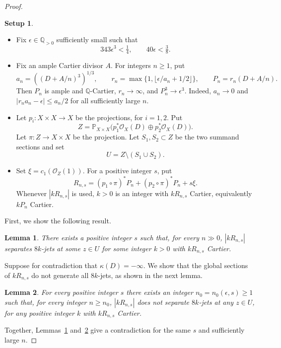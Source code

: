 \documentclass[12pt,a4paper,psamsfonts]{amsart}
\theoremstyle{definition}
\newtheorem*{setup}{Setup}
\theoremstyle{plain}
\newtheorem{lemma}{Lemma}[section]
\newcommand{\Q}{\mathbb Q}
\newcommand{\OO}{\mathcal O}
\begin{document}
\begin{proof}
\begin{setup}
\leavevmode
\begin{itemize}
\setlength{\itemsep}{2pt}
\setlength{\parsep}{0pt}
\item Fix $\epsilon\in\Q_{>0}$ sufficiently small such that
\[
 343\epsilon^3<\tfrac14,\qquad40\epsilon<\tfrac38.
\]
\item Fix an ample Cartier divisor $A$.
For integers $n\ge1$, put
\[
 a_n=((D+A/n)^3)^{1/3},\qquad
 r_n=\max\{1,\lfloor\epsilon/a_n+1/2\rfloor\},\qquad
 P_n=r_n(D+A/n).
\]
Then $P_n$ is ample and $\mathbb{Q}$-Cartier, $r_n\to\infty$, and
$P_n^3\to\epsilon^3$. Indeed, $a_n\to0$ and
$|r_na_n-\epsilon|\le a_n/2$ for all sufficiently large $n$.
\item Let $p_i:X\times X\to X$ be the projections, for $i=1,2$.
Put
\[
 Z=\mathbb P_{X\times X}
       \bigl(p_1^*\OO_X(D)\oplus p_2^*\OO_X(D)\bigr).
\]
Let $\pi:Z\to X\times X$ be the projection.
Let $S_1,S_2\subset Z$ be the two summand sections and set
\[
 U=Z\setminus(S_1\cup S_2).
\]
\item Set $\xi=c_1(\OO_Z(1))$. For a positive integer $s$, put
\[
 R_{n,s}=(p_1\circ\pi)^*P_n+(p_2\circ\pi)^*P_n+s\xi.
\]
Whenever $|kR_{n,s}|$ is used, $k>0$ is an integer with
$kR_{n,s}$ Cartier, equivalently $kP_n$ Cartier.
\end{itemize}

\end{setup}

First, we show the following result.

\begin{lemma}\label{lem:full-jets}
There exists a positive integer $s$ such that, for every $n\gg0$,
$|kR_{n,s}|$ separates $8k$-jets at some $z\in U$ for some
integer $k>0$ with $kR_{n,s}$ Cartier.
\end{lemma}

Suppose for contradiction that $\kappa(D)=-\infty$.
We show that the global sections of $kR_{n,s}$ do not generate all
$8k$-jets, as shown in the next lemma.

\begin{lemma}\label{lem:full-nojets}
For every positive integer $s$ there exists
an integer $n_0=n_0(\epsilon,s)\ge1$ such that, for every integer
$n\ge n_0$, $|kR_{n,s}|$ does not separate $8k$-jets at any $z\in U$,
for any positive integer $k$ with $kR_{n,s}$ Cartier.
\end{lemma}

Together, Lemmas~\ref{lem:full-jets} and~\ref{lem:full-nojets}
give a contradiction for the same $s$ and sufficiently large $n$.\qedhere
\end{proof}
\end{document}
